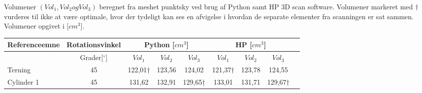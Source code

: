 \label{app:3d_scan_vol}
Volumener $(Vol_1, Vol_2 og Vol_3)$ beregnet fra meshet punktsky ved brug af Python samt HP 3D scan software.  
Volumener markeret med $\dagger$ vurderes til ikke at være optimale, hvor der tydeligt kan ses en afvigelse i hvordan de separate elementer fra scanningen er sat sammen. Volumener opgivet i [$cm^3$]. 
 
 \begin{table}[h]
  \centering
  \label{tab:ref_vol_scan}
  \begin{tabular}{l c c c c| c c c c}
  \toprule
 \multicolumn{1}{l}{Referenceemne} & 	\multicolumn{1}{c}{Rotationsvinkel} & \multicolumn{3}{c}{Python [$cm^3$]} &	\multicolumn{3}{c}{HP [$cm^3$]}  \\
\midrule
 \multicolumn{1}{l}{} & 	\multicolumn{1}{c}{Grader[$^{\circ}$]} & \multicolumn{1}{c}{$Vol_1$} &  \multicolumn{1}{c}{$Vol_2$}  & \multicolumn{1}{c|}{$Vol_3$} &	\multicolumn{1}{c}{$Vol_1$}  & \multicolumn{1}{c}{$Vol_2$} & \multicolumn{1}{c}{$Vol_3$} \\
\cmidrule(r){1-1} \cmidrule(r){2-2} \cmidrule(r){3-3}
\cmidrule(r){4-4} \cmidrule(r){5-5} \cmidrule(r){6-6} \cmidrule(r){7-7} \cmidrule(l){8-8}

Terning & 45 & 122,01$\dagger$ & 123,56 & 124,02 & 121,37$\dagger$ & 123,78 & 124,55  \\
Cylinder 1 & 45 & 131,62 & 132,91 & 129,65$\dagger$ & 133,01 & 131,71 & 129,67$\dagger$ \\
  \bottomrule
  \end{tabular}
  \end{table}